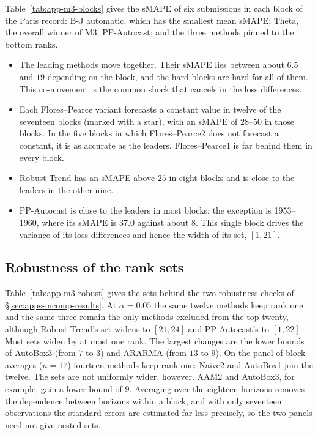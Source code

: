 \begin{appendix}
Table~\ref{tab:app-m3-blocks} gives the sMAPE of six submissions in each block of the
Paris record: B-J automatic, which has the smallest mean sMAPE; Theta, the overall
winner of M3; PP-Autocast; and the three methods pinned to the bottom ranks.
\begin{itemize}[leftmargin=*]
  \item The leading methods move together. Their sMAPE lies between about $6.5$ and $19$
    depending on the block, and the hard blocks are hard for all of them. This
    co-movement is the common shock that cancels in the loss differences.
  \item Each Flores--Pearce variant forecasts a constant value in twelve of the
    seventeen blocks (marked with a star), with an sMAPE of $28$--$50$ in those blocks.
    In the five blocks in which Flores--Pearce2 does not forecast a constant, it is as
    accurate as the leaders. Flores--Pearce1 is far behind them in every block.
  \item Robust-Trend has an sMAPE above $25$ in eight blocks and is close to the leaders
    in the other nine.
  \item PP-Autocast is close to the leaders in most blocks; the exception is 1953--1960, where its
    sMAPE is $37.0$ against about $8$. This single block drives the variance of its loss
    differences and hence the width of its set, $[1,21]$.
\end{itemize}

\tabAppMThreeBlocks

\subsection{Robustness of the rank sets}
\label{app:add-m3-robust}

Table~\ref{tab:app-m3-robust} gives the sets behind the two robustness checks of
\S\ref{sec:apps-mcomp-results}. At $\alpha=0.05$ the same twelve methods keep rank one
and the same three remain the only methods excluded from the top twenty, although
Robust-Trend's set widens to $[21,24]$ and PP-Autocast's to $[1,22]$. Most sets widen by at most one rank. The
largest changes are the lower bounds of AutoBox3 (from $7$ to $3$) and ARARMA (from $13$
to $9$). On the panel of block averages ($n=17$) fourteen methods keep rank one: Naive2
and AutoBox1 join the twelve. The sets are not uniformly wider, however. AAM2 and
AutoBox3, for example, gain a lower bound of $9$. Averaging over the eighteen horizons
removes the dependence between horizons within a block, and with only seventeen
observations the standard errors are estimated far less precisely, so the two panels
need not give nested sets.


\end{appendix}
